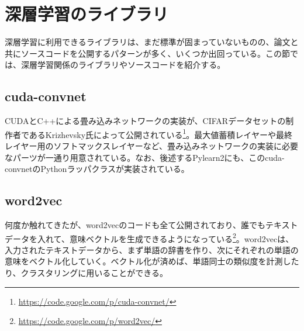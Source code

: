 \section{深層学習のライブラリ}
深層学習に利用できるライブラリは、まだ標準が固まっていないものの、論文と共にソースコードを公開するパターンが多く、いくつか出回っている。この節では、深層学習関係のライブラリやソースコードを紹介する。

\subsection{cuda-convnet}
CUDAとC++による畳み込みネットワークの実装が、CIFARデータセットの制作者であるKrizhevsky氏によって公開されている\footnote{\url{https://code.google.com/p/cuda-convnet/}}。最大値蓄積レイヤーや最終レイヤー用のソフトマックスレイヤーなど、畳み込みネットワークの実装に必要なパーツが一通り用意されている。なお、後述するPylearn2にも、このcuda-convnetのPythonラッパクラスが実装されている。

\subsection{word2vec}
何度か触れてきたが、word2vecのコードも全て公開されており、誰でもテキストデータを入れて、意味ベクトルを生成できるようになっている\footnote{\url{https://code.google.com/p/word2vec/}}。word2vecは、入力されたテキストデータから、まず単語の辞書を作り、次にそれぞれの単語の意味をベクトル化していく。ベクトル化が済めば、単語同士の類似度を計測したり、クラスタリングに用いることができる。


